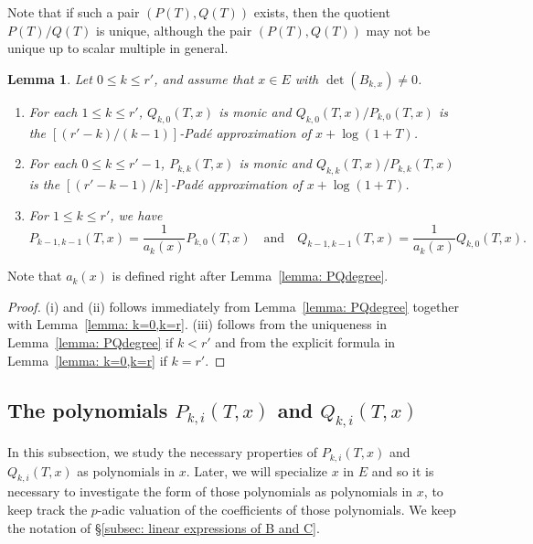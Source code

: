 \documentclass[11pt]{amsart}
\theoremstyle{definition}
\numberwithin{equation}{subsection}
\theoremstyle{plain}
\theoremstyle{plain}
\theoremstyle{plain}
\theoremstyle{plain}
\theoremstyle{plain}
\theoremstyle{plain}
\theoremstyle{plain}
\theoremstyle{plain}
\theoremstyle{plain}
\newtheorem{lemm}[equation]{Lemma}
\theoremstyle{plain}
\theoremstyle{plain}
\theoremstyle{plain}
\theoremstyle{definition}
\theoremstyle{definition}
\theoremstyle{definition}
\theoremstyle{remark}
\renewcommand{\(}{\textup{(}}
\renewcommand{\)}{\textup{)}}
\begin{document}
Note that if such a pair $(P(T),Q(T))$ exists, then the quotient $P(T)/Q(T)$ is unique, although the pair $(P(T),Q(T))$ may not be unique up to scalar multiple in general.


\begin{lemm}\label{lemma: PQFad'e}
Let $0\leq k\leq r'$, and assume that $x\in E$ with $\det (B_{k,x})\neq 0$.
    \begin{enumerate}[leftmargin=*]
        \item For each $1\leq k\leq r'$, $Q_{k,0}(T,x)$ is monic and $Q_{k,0}(T,x)/P_{k,0}(T,x)$ is the $[(r'-k)/(k-1)]$-Pad\'e approximation of $x+\log(1+T)$.
        \item For each $0\leq k\leq r'-1$, $P_{k,k}(T,x)$ is monic and $Q_{k,k}(T,x)/P_{k,k}(T,x)$ is the $[(r'-k-1)/k]$-Pad\'e approximation of $x+\log(1+T)$.
        \item For $1\leq k\leq r'$, we have
        $$ P_{k-1,k-1}(T,x)=\frac{1}{a_k(x)}P_{k,0}(T,x)\quad\mbox{and}\quad Q_{k-1,k-1}(T,x)=\frac{1}{a_k(x)}Q_{k,0}(T,x).$$
    \end{enumerate}
\end{lemm}
Note that $a_k(x)$ is defined right after Lemma~\ref{lemma: PQdegree}.


\begin{proof}
(i) and (ii) follows immediately from Lemma~\ref{lemma: PQdegree} together with Lemma~\ref{lemma: k=0,k=r}. (iii) follows from the uniqueness in Lemma~\ref{lemma: PQdegree} if $k<r'$ and from the explicit formula in Lemma~\ref{lemma: k=0,k=r} if $k=r'$.
\end{proof}







\subsection{The polynomials $P_{k,i}(T,x)$ and $Q_{k,i}(T,x)$}
In this subsection, we study the necessary properties of $P_{k,i}(T,x)$ and $Q_{k,i}(T,x)$ as polynomials in $x$. Later, we will specialize $x$ in $E$ and so it is necessary to investigate the form of those polynomials as polynomials in $x$, to keep track the $p$-adic valuation of the coefficients of those polynomials. We keep the notation of \S\ref{subsec: linear expressions of B and C}.
\end{document}
